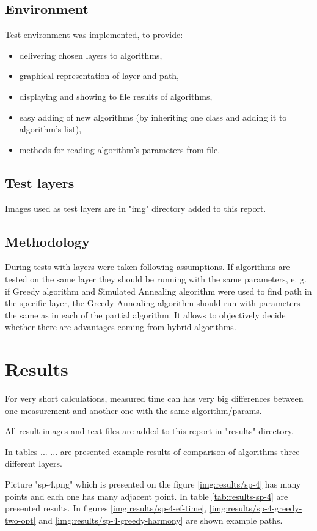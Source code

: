 \documentclass[titlepage]{article}
\begin{document}
\subsection{Environment}
Test environment was implemented, to provide:
\begin{itemize}
\item delivering chosen layers to algorithms,
\item graphical representation of layer and path,
\item displaying and showing to file results of algorithms,
\item easy adding of new algorithms (by inheriting one class and adding it to algorithm's list),
\item methods for reading algorithm's parameters from file.
\end{itemize}

\subsection{Test layers}
Images used as test layers are in "img" directory added to this report.

\subsection{Methodology}

During tests with layers were taken following assumptions. If algorithms are tested on the same layer they should be running with the same parameters, e. g. if Greedy algorithm and Simulated Annealing algorithm were used to find path in the specific layer, the Greedy Annealing algorithm should run with parameters the same as in each of the partial algorithm. It allows to objectively decide whether there are advantages coming from hybrid algorithms.

\section{Results}
For very short calculations, measured time can has very big differences between one measurement and another one with the same algorithm/params.

All result images and text files are added to this report in "results" directory.

In tables ... ... are presented example results of comparison of algorithms three different layers.

Picture "sp-4.png" which is presented on the figure \ref{img:results/sp-4} has many points and each one has many adjacent point. In table \ref{tab:results-sp-4} are presented results. In figures \ref{img:results/sp-4-ef-time}, \ref{img:results/sp-4-greedy-two-opt} and \ref{img:results/sp-4-greedy-harmony} are shown example paths.
\end{document}
